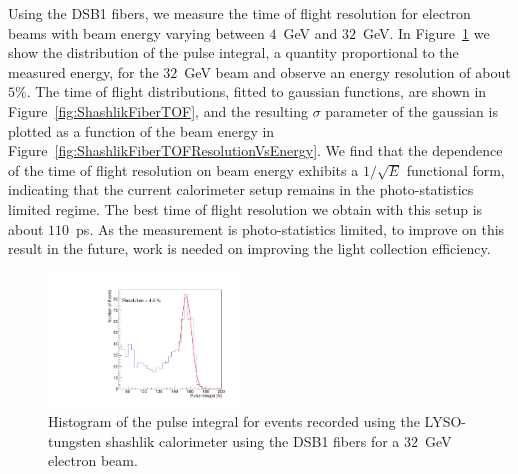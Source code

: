 \documentclass[11pt]{article}
\begin{document}
Using the DSB1 fibers, we measure the time of flight resolution
for electron beams with beam energy varying between $4$~GeV and $32$~GeV.
In Figure~\ref{fig:ShashlikFiberEnergy32GeV} we show the distribution
of the pulse integral, a quantity proportional to the measured energy,
for the $32$~GeV beam and observe an energy resolution of about $5\%$.
The time of flight distributions, fitted to gaussian functions,
are shown in Figure~\ref{fig:ShashlikFiberTOF}, and the resulting
$\sigma$ parameter of the gaussian is plotted as a function of the
beam energy in Figure~\ref{fig:ShashlikFiberTOFResolutionVsEnergy}.
We find that the dependence of the time of flight resolution on
beam energy exhibits a $1/\sqrt{E}$ functional form, indicating
that the current calorimeter setup remains in the photo-statistics
limited regime. The best time of flight resolution we obtain
with this setup is about $110$~ps. As the measurement is photo-statistics
limited, to improve on this result in the future, work is needed
on improving the light collection efficiency. 

\begin{figure}[h] \centering
\includegraphics[width=0.45\textwidth]{figs/TOF_ShashlikDSB1Fiber_Electron_32GeV_energy} 
\caption{ Histogram of the pulse integral for events recorded using
the LYSO-tungsten shashlik calorimeter using the DSB1 fibers for 
a $32$~GeV electron beam. } 
\label{fig:ShashlikFiberEnergy32GeV}
\end{figure}
\end{document}
